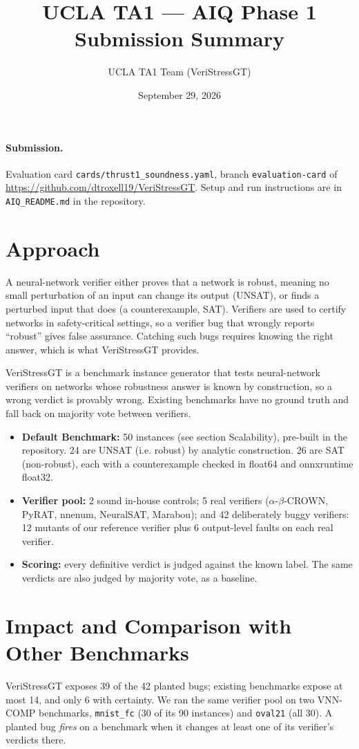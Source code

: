 \documentclass[11pt]{article}
\title{UCLA TA1 --- AIQ Phase 1 Submission Summary}
\author{UCLA TA1 Team (VeriStressGT)}
\date{September 29, 2026}
\newcommand{\code}[1]{\texttt{#1}}
\begin{document}
\sloppy
\maketitle

\paragraph{Submission.}
Evaluation card \code{cards/thrust1\_soundness.yaml}, branch \code{evaluation-card} of
\url{https://github.com/dtroxell19/VeriStressGT}. Setup and
run instructions are in \code{AIQ\_README.md} in the repository.

\section{Approach}
A neural-network verifier either proves that a network is robust, meaning no small perturbation of
an input can change its output (UNSAT), or finds a perturbed input that does (a counterexample,
SAT). Verifiers are used to certify networks in safety-critical settings, so a verifier bug that
wrongly reports ``robust'' gives false assurance. Catching such bugs requires knowing the right
answer, which is what VeriStressGT provides.

VeriStressGT is a benchmark instance generator that tests neural-network verifiers on networks whose robustness answer is known by
construction, so a wrong verdict is provably wrong. Existing benchmarks have no
ground truth and fall back on majority vote between verifiers.
\begin{itemize}
  \item \textbf{Default Benchmark:} 50 instances (see section Scalability), pre-built in the repository. 24 are UNSAT (i.e. robust) by analytic
  construction. 26 are SAT (non-robust), each with a counterexample checked in float64 and onnxruntime float32.
  \item \textbf{Verifier pool:} 2 sound in-house controls; 5 real verifiers
  ($\alpha$-$\beta$-CROWN, PyRAT, nnenum, NeuralSAT, Marabou); and 42 deliberately buggy
  verifiers: 12 mutants of our reference verifier plus 6 output-level faults on each real verifier.
  \item \textbf{Scoring:} every definitive verdict is judged against the known label. The same
  verdicts are also judged by majority vote, as a baseline.
\end{itemize}

\section{Impact and Comparison with Other Benchmarks}
VeriStressGT exposes 39 of the 42 planted bugs; existing benchmarks expose at most 14, and only 6
with certainty. We ran the
same verifier pool on two VNN-COMP benchmarks, \code{mnist\_fc} (30 of its 90 instances) and
\code{oval21} (all 30). A planted bug \emph{fires} on a benchmark when it changes at least one of its
verifier's verdicts there.
\end{document}
